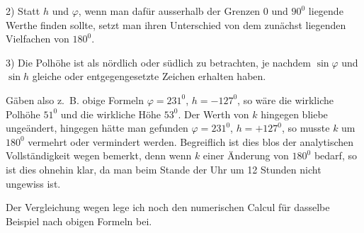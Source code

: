 2) Statt $h$ und $\varphi$, wenn man dafür ausserhalb der Grenzen $0$ und $90^0$ liegende Werthe finden sollte, setzt man ihren Unterschied von dem zunächst liegenden Vielfachen von $180^0$.

3) Die Polhöhe ist als nördlich oder südlich zu betrachten, je nachdem $\sin\varphi$ und $\sin h$ gleiche oder entgegengesetzte Zeichen erhalten haben.

Gäben also z.\ B. obige Formeln $\varphi=231^0$, $h=-127^0$, so wäre die wirkliche Polhöhe $51^0$ und die wirkliche Höhe $53^0$. Der Werth von $k$ hingegen bliebe ungeändert, hingegen hätte man gefunden $\varphi=231^0$, $h=+127^0$, so musste $k$ um $180^0$ vermehrt oder vermindert werden. Begreiflich ist dies blos der analytischen Vollständigkeit wegen bemerkt, denn wenn $k$ einer Änderung von $180^0$ bedarf, so ist dies ohnehin klar, da man beim Stande der Uhr um 12 Stunden nicht ungewiss ist.

Der Vergleichung wegen lege ich noch den numerischen Calcul für dasselbe Beispiel nach obigen Formeln bei.

